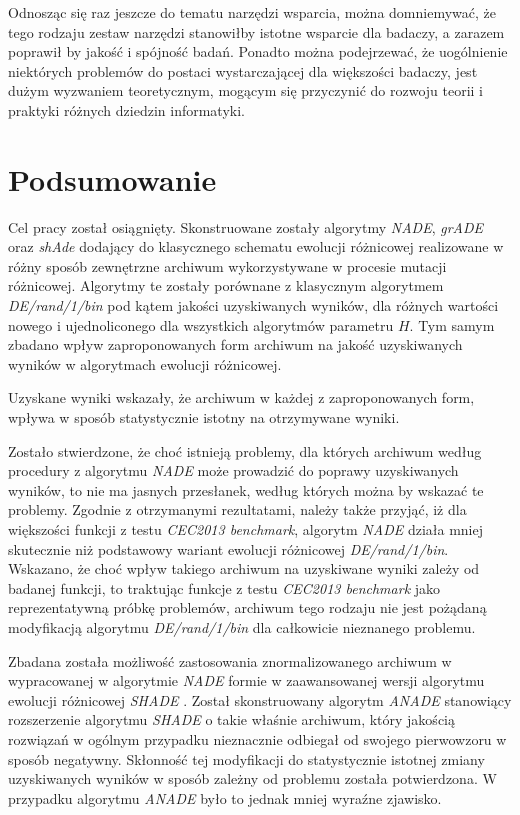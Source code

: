 \documentclass[12pt,a4paper]{report}
\begin{document}
{{{{{{{{\begin{description}
\end{description}
}
\par{
Odnosząc się raz jeszcze do tematu narzędzi wsparcia, można domniemywać, że tego rodzaju zestaw narzędzi stanowiłby istotne wsparcie dla badaczy, a zarazem poprawił by jakość i spójność badań. Ponadto można podejrzewać, że uogólnienie niektórych problemów do postaci wystarczającej dla większości badaczy, jest dużym wyzwaniem teoretycznym, mogącym się przyczynić do rozwoju teorii i praktyki różnych dziedzin informatyki.
}


\chapter{Podsumowanie}
\par{
Cel pracy został osiągnięty. Skonstruowane zostały algorytmy \emph{NADE}, \emph{grADE} oraz \emph{shAde} dodający do klasycznego schematu ewolucji różnicowej realizowane w różny sposób zewnętrzne archiwum wykorzystywane w procesie mutacji różnicowej. Algorytmy te zostały porównane z klasycznym algorytmem \emph{DE/rand/1/bin} pod kątem jakości uzyskiwanych wyników, dla różnych wartości nowego i ujednoliconego dla wszystkich algorytmów parametru $H$. Tym samym zbadano wpływ zaproponowanych form archiwum na jakość uzyskiwanych wyników w algorytmach ewolucji różnicowej.
}
\par{
Uzyskane wyniki wskazały, że archiwum w każdej z zaproponowanych form, wpływa w sposób statystycznie istotny na otrzymywane wyniki.
}
\par{
Zostało stwierdzone, że choć istnieją problemy, dla których archiwum według procedury z algorytmu \emph{NADE} może prowadzić do poprawy uzyskiwanych wyników, to nie ma jasnych przesłanek, według których można by wskazać te problemy. Zgodnie z otrzymanymi rezultatami, należy także przyjąć, iż dla większości funkcji z testu \emph{CEC2013 benchmark}, algorytm \emph{NADE} działa mniej skutecznie niż podstawowy wariant ewolucji różnicowej \emph{DE/rand/1/bin}. Wskazano, że choć wpływ takiego archiwum na uzyskiwane wyniki zależy od badanej funkcji, to traktując funkcje z testu \emph{CEC2013 benchmark} jako reprezentatywną próbkę problemów, archiwum tego rodzaju nie jest pożądaną modyfikacją algorytmu \emph{DE/rand/1/bin} dla całkowicie nieznanego problemu.
}
\par{
Zbadana została możliwość zastosowania znormalizowanego archiwum w wypracowanej w algorytmie \emph{NADE} formie w zaawansowanej wersji algorytmu ewolucji różnicowej \emph{SHADE} \cite{SHADE}. Został skonstruowany algorytm \emph{ANADE} stanowiący rozszerzenie algorytmu \emph{SHADE} o takie właśnie archiwum, który jakością rozwiązań w ogólnym przypadku nieznacznie odbiegał od swojego pierwowzoru w sposób negatywny. Skłonność tej modyfikacji do statystycznie istotnej zmiany uzyskiwanych wyników w sposób zależny od problemu została potwierdzona. W przypadku algorytmu \emph{ANADE} było to jednak mniej wyraźne zjawisko.
}}}}}}}}
\end{document}
